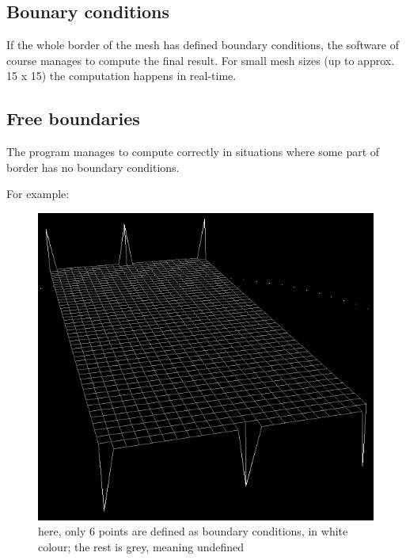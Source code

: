 \documentclass[a4paper,12pt]{article}
\begin{document}
\subsection{Bounary conditions}

If the whole border of the mesh has defined boundary conditions, the software of course manages to compute the final
result. For small mesh sizes (up to approx. 15 x 15) the computation happens in real-time.

\subsection{Free boundaries}

The program manages to compute correctly in situations where some part of border has no boundary conditions.

For example:

\begin{figure}[H]
\begin{center}
  \includegraphics[width=\textwidth]{six_points}
\end{center}
\caption{here, only 6 points are defined as boundary conditions, in white colour; the rest is grey, meaning undefined}
\end{figure}
\end{document}
